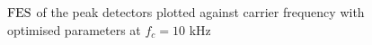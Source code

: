 \documentclass[../main2.tex]{subfiles}
\providecommand{\rootdir}{..}
\begin{document}
\begin{figure}[h]
\captionsetup{justification=centering}
\begin{subfigure}{\linewidth}
\centerline{}
\end{subfigure}
\par\bigskip
\begin{subfigure}{\linewidth}
\centerline{}
\end{subfigure}
\caption{$\text{FES}$ of the peak detectors plotted against carrier frequency with optimised parameters at $f_c=10$ kHz}
\label{fig:peak_det_opt_env_fc10000_dep_fes}
\end{figure}

\FloatBarrier
\end{document}
